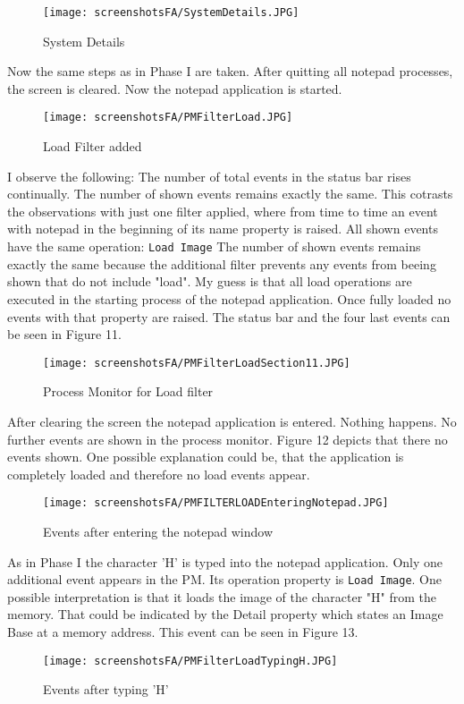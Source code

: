 \documentclass{Gharaei}
\begin{document}
 \begin{figure}[H]
    \centering
    \texttt{[image: screenshotsFA/SystemDetails.JPG]}
\caption{System Details}
\end{figure}
Now the same steps as in Phase I are taken.
After quitting all notepad processes, the screen is cleared. Now the notepad application is started. 
\begin{figure} [H]
    \centering
    \texttt{[image: screenshotsFA/PMFilterLoad.JPG]}
    \caption{Load Filter added}
\end{figure}
I observe the following: The number of total events in the status bar rises continually. The number of shown events remains exactly the same. This cotrasts the observations with just one filter applied, where from time to time an event with notepad in the beginning of its name property is raised. All shown events have the same operation: \texttt{Load Image} The number of shown events remains exactly the same because the additional filter prevents any events from beeing shown that do not include "load". My guess is that all load operations are executed in the starting process of the notepad application. Once fully loaded no events with that property are raised. The status bar and the four last events can be seen in Figure 11.
\begin{figure}[H]
    \centering
\texttt{[image: screenshotsFA/PMFilterLoadSection11.JPG]}
\caption{Process Monitor for Load filter}
\end{figure}
After clearing the screen the notepad application is entered. Nothing happens. No further events are shown in the process monitor. Figure 12 depicts that there no events shown. One possible explanation could be, that the application is completely loaded and therefore no load events appear. 
\begin{figure}[H]
    \centering
\texttt{[image: screenshotsFA/PMFILTERLOADEnteringNotepad.JPG]}
\caption{Events after entering the notepad window}
\end{figure}
As in Phase I the character 'H' is typed into the notepad application. 
Only one additional event appears in the PM. Its operation property is \texttt{Load Image}. One possible interpretation is that it loads the image of the character "H" from the memory. That could be indicated by the Detail property which states an Image Base at a memory address.
This event can be seen in Figure 13.
\begin{figure}[H]
    \centering
\texttt{[image: screenshotsFA/PMFilterLoadTypingH.JPG]}
        \caption{Events after typing 'H'}
\end{figure}
\end{document}
